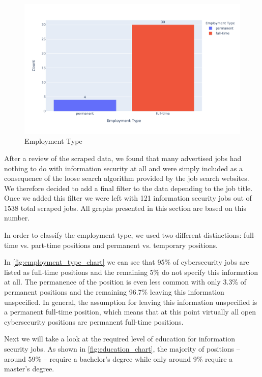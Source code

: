 \documentclass[runningheads]{llncs}
\begin{document}
\begin{figure}[H]
	\centering
  \includegraphics[width=\textwidth]{employment-type-bar-chart.pdf}
	\caption{Employment Type}
	\label{fig:employment_type_chart}
\end{figure}

After a review of the scraped data, we found that many advertised jobs had nothing to do with information security at all and were simply included as a consequence of the loose search algorithm provided by the job search websites. We therefore decided to add a final filter to the data depending to the job title. Once we added this filter we were left with 121 information security jobs out of 1538 total scraped jobs. All graphs presented in this section are based on this number.

In order to classify the employment type, we used two different distinctions: full-time vs. part-time positions and permanent vs. temporary positions.

In \autoref{fig:employment_type_chart} we can see that 95\% of cybersecurity jobs are listed as full-time positions and the remaining 5\% do not specify this information at all. The permanence of the position is even less common with only 3.3\% of permanent positions and the remaining 96.7\% leaving this information unspecified. In general, the assumption for leaving this information unspecified is a permanent full-time position, which means that at this point virtually all open cybersecurity positions are permanent full-time positions.

Next we will take a look at the required level of education for information security jobs. As shown in \autoref{fig:education_chart}, the majority of positions -- around 59\% -- require a bachelor's degree while only around 9\% require a master's degree.
\end{document}
